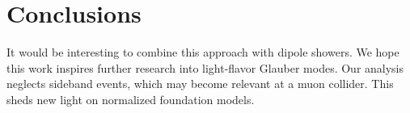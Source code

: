 \section{Conclusions}\label{sec:conclusions}

It would be interesting to combine this approach with dipole showers. We
hope this work inspires further research into light-flavor Glauber
modes. Our analysis neglects sideband events, which may become relevant
at a muon collider. This sheds new light on normalized foundation
models.


